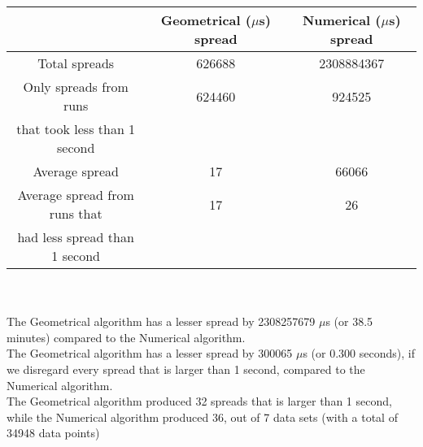 \begin{tabular}[3]{c|c|c}
 & Geometrical ($\mu$s) spread & Numerical ($\mu$s) spread\\
\hline
Total spreads & 626688 & 2308884367 \\ 
\hline 
Only spreads from runs & 624460 & 924525 \\ 
that took less than 1 second & & \\ 
\hline
Average spread & 17 & 66066 \\
\hline
Average spread from runs that & 17 & 26 \\ 
had less spread than 1 second & & \\ 
\end{tabular}\\ \\
The Geometrical algorithm has a lesser spread by 2308257679 $\mu$s (or 38.5 minutes) compared to the Numerical algorithm.\\
The Geometrical algorithm has a lesser spread by 300065 $\mu$s (or 0.300 seconds), if we disregard every spread that is larger than 1 second, compared to the Numerical algorithm.\\
The Geometrical algorithm produced 32 spreads that is larger than 1 second, while the Numerical algorithm produced 36, out of 7 data sets (with a total of 34948 data points)\\
